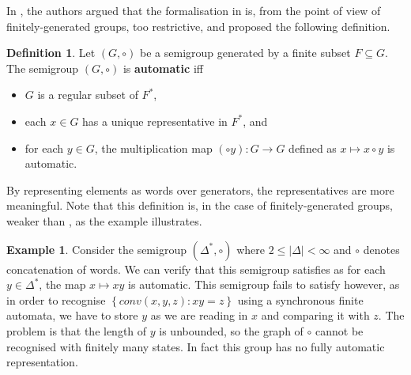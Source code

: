 \documentclass[british,a4paper,11pt,abstract=on]{scrreprt}
\theoremstyle{definition}
\newtheorem{definition}[theorem]{Definition}
\newtheorem{example}[theorem]{Example}
\theoremstyle{remark}
\newcommand{\set}[1]{\left\{ #1 \right\}}
\newcommand{\abs}[1]{\left\lvert #1 \right\rvert}
\begin{document}
In \autocite{Epstein}, the authors argued that the formalisation in  is, from the point of view of finitely-generated groups, too restrictive, and proposed the following definition.
\begin{definition} \label{automatic group}
    Let \((G,\circ)\) be a semigroup generated by a finite subset \(F\subseteq G\).
    The semigroup \((G,\circ)\) is \textbf{automatic} iff
    \begin{itemize}
        \item \(G\) is a regular subset of \(F^*\),
        \item each \(x\in G\) has a unique representative in \(F^*\), and
        \item for each \(y\in G\), the multiplication map \((\circ y): G\to G\) defined as \(x\mapsto x\circ y\) is automatic.
    \end{itemize}
\end{definition}
By representing elements as words over generators, the representatives are more meaningful.
Note that this definition is, in the case of finitely-generated groups, weaker than , as the example illustrates.
\begin{example}
    Consider the semigroup \((\Delta^*, \circ)\) where \(2\leq \abs{\Delta} <\infty\) and \(\circ\) denotes concatenation of words.
    We can verify that this semigroup satisfies  as for each \(y\in\Delta^*\), the map \(x\mapsto xy\) is automatic.
    This semigroup fails to satisfy  however, as in order to recognise
    \(\set{conv(x,y,z):xy = z}\) using a synchronous finite automata, we have to store \(y\) as we are reading in \(x\) and comparing it with \(z\).
    The problem is that the length of \(y\) is unbounded, so the graph of \(\circ\) cannot be recognised with finitely many states.
    In fact this group has no fully automatic representation.
\end{example}
\end{document}
